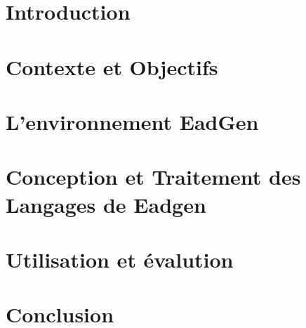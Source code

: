 \documentclass[twocolumn]{article}
\begin{document}
\section{Introduction}


\section{Contexte et Objectifs}


\section{L’environnement EadGen}


\section{Conception et Traitement des Langages de Eadgen}


\section{Utilisation et évalution}


\section{Conclusion}

\end{document}
